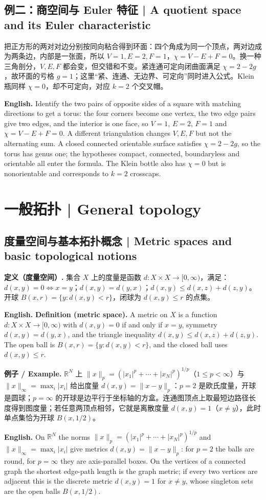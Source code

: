 \documentclass[UTF8,11pt,a4paper]{ctexart}
\newcommand{\EN}[1]{\par\noindent\textbf{English.} #1\par}
\newcommand{\EX}[2]{\par\noindent\textbf{例子 / Example.} #1\par\EN{#2}}
\begin{document}
\subsection*{例二：商空间与 Euler 特征 | A quotient space and its Euler characteristic}
\noindent 把正方形的两对对边分别按同向粘合得到环面：四个角成为同一个顶点，两对边成为两条边，内部是一张面，所以 $V=1,E=2,F=1$，$\chi=V-E+F=0$。换一种三角剖分，$V,E,F$ 都会变，但交错和不变。紧连通可定向闭曲面满足 $\chi=2-2g$，故环面的亏格 $g=1$；这里“紧、连通、无边界、可定向”同时进入公式。Klein 瓶同样 $\chi=0$，却不可定向，对应 $k=2$ 个交叉帽。
\EN{Identify the two pairs of opposite sides of a square with matching directions to get a torus: the four corners become one vertex, the two edge pairs give two edges, and the interior is one face, so $V=1$, $E=2$, $F=1$ and $\chi=V-E+F=0$. A different triangulation changes $V,E,F$ but not the alternating sum. A closed connected orientable surface satisfies $\chi=2-2g$, so the torus has genus one; the hypotheses compact, connected, boundaryless and orientable all enter the formula. The Klein bottle also has $\chi=0$ but is nonorientable and corresponds to $k=2$ crosscaps.}

\section{一般拓扑 | General topology}

\subsection{度量空间与基本拓扑概念 | Metric spaces and basic topological notions}
\noindent\textbf{定义（度量空间）.} 集合 $X$ 上的度量是函数 $d:X\times X\to[0,\infty)$，满足：$d(x,y)=0\iff x=y$；$d(x,y)=d(y,x)$；$d(x,y)\le d(x,z)+d(z,y)$。开球 $B(x,r)=\{y:d(x,y)<r\}$，闭球为 $d(x,y)\le r$ 的点集。
\EN{\textbf{Definition (metric space).} A metric on $X$ is a function $d:X\times X\to[0,\infty)$ with $d(x,y)=0$ if and only if $x=y$, symmetry $d(x,y)=d(y,x)$, and the triangle inequality $d(x,y)\le d(x,z)+d(z,y)$. The open ball is $B(x,r)=\{y:d(x,y)<r\}$, and the closed ball uses $d(x,y)\le r$.}

\EX{$\mathbb R^N$ 上 $\|x\|_p=(|x_1|^p+\cdots+|x_N|^p)^{1/p}$（$1\le p<\infty$）与 $\|x\|_\infty=\max_i|x_i|$ 给出度量 $d(x,y)=\|x-y\|_p$：$p=2$ 是欧氏度量，开球是圆球；$p=\infty$ 的开球是边平行于坐标轴的方盒。连通图顶点上取最短边路径长度得到图度量；若任意两顶点相邻，它就是离散度量 $d(x,y)=1$（$x\ne y$），此时单点集恰为开球 $B(x,1/2)$。}{On $\mathbb R^N$ the norms $\|x\|_p=(|x_1|^p+\cdots+|x_N|^p)^{1/p}$ and $\|x\|_\infty=\max_i|x_i|$ give metrics $d(x,y)=\|x-y\|_p$: for $p=2$ the balls are round, for $p=\infty$ they are axis-parallel boxes. On the vertices of a connected graph the shortest edge-path length is the graph metric; if every two vertices are adjacent this is the discrete metric $d(x,y)=1$ for $x\ne y$, whose singleton sets are the open balls $B(x,1/2)$.}
\end{document}
